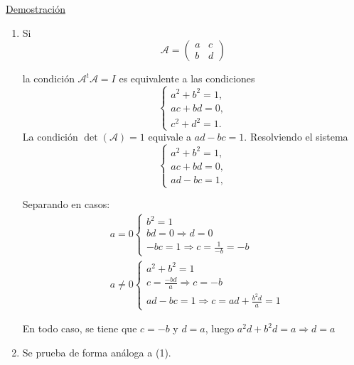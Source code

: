 \documentclass[12pt, a4paper, ones, notitlepage, openany,titlepage]{article}
\newcommand{\demostracion}{\noindent\underline{Demostración}}
\begin{document}
\demostracion
\begin{enumerate}[label=(\arabic*)]
	\item Si
	$$
	\mathcal{A}=\left(\begin{array}{ll}
		a & c \\
		b & d
	\end{array}\right)
	$$
	
	la condición $\mathcal{A}^{t} \mathcal{A}=I$ es equivalente a las condiciones
	$$
	\begin{cases}
		a^{2}+b^{2}=1, \\ a c+b d=0, \\ c^{2}+d^{2}=1 .
	\end{cases}
	$$
	La condición $\operatorname{det}(\mathcal{A})=1$ equivale a $a d-b c=1$. Resolviendo el sistema
	$$
	\begin{cases}
		a^{2}+b^{2}=1, \\ a c+b d=0, \\ a d-b c=1,
	\end{cases}
	$$
	
	Separando en casos:
	\begin{align*}
		& a = 0
		\begin{cases}
			b^2 = 1 \\
			bd = 0 \Longrightarrow d = 0 \\
			-bc = 1 \Longrightarrow c = \frac{1}{-b} = -b
		\end{cases} \\
		& a \neq 0
		\begin{cases}
			a^2 + b^2 = 1 \\
			c = \frac{-bd}{a} \Longrightarrow c = -b \\
			ad-bc = 1 \Longrightarrow c = ad + \frac{b^2 d}{a} = 1
		\end{cases}
	\end{align*}
	
	En todo caso, se tiene que $c=-b$ y $d=a$, luego $a^2 d + b^2 d = a \Longrightarrow d = a$
	
	\item Se prueba de forma análoga a (1).
\end{enumerate}
\end{document}
